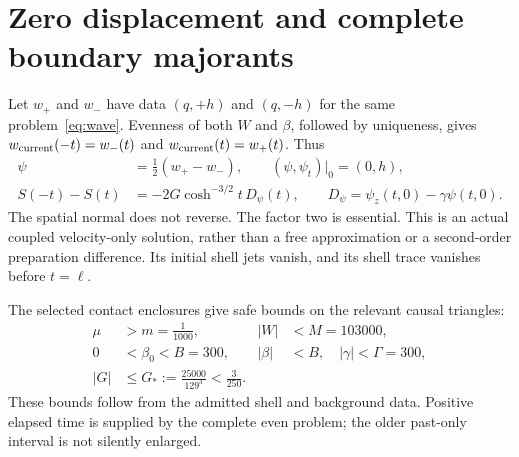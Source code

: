 \documentclass[11pt]{article}
\begin{document}
\section{Zero displacement and complete boundary majorants}
Let $w_+$ and $w_-$ have data $(q,+h)$ and $(q,-h)$ for the same
problem~\eqref{eq:wave}. Evenness of both $W$ and $\beta$, followed by
uniqueness, gives $w_{\rm current}(-t)=w_-(t)$ and
$w_{\rm current}(t)=w_+(t)$. Thus
\[
\begin{aligned}
 \psi&=\tfrac12(w_+-w_-),\qquad (\psi,\psi_t)|_0=(0,h),\\
 S(-t)-S(t)&=-2G\cosh^{-3/2}t\,D_\psi(t),\qquad
 D_\psi=\psi_z(t,0)-\gamma\psi(t,0).
\end{aligned}
\]
The spatial normal does not reverse. The factor two is essential. This is
an actual coupled velocity-only solution, rather than a free approximation
or a second-order preparation difference. Its initial shell jets vanish,
and its shell trace vanishes before $t=\ell$.

The selected contact enclosures give safe bounds on the relevant causal
triangles:
\begin{equation}
\begin{aligned}
 \mu&>m=\frac1{1000},& |W|&<M=103000,\\
 0&<\beta_0<B=300,& |\beta|&<B,\quad |\gamma|<\Gamma=300,\\
 |G|&\le G_*:=\frac{25000}{129^3}<\frac3{250}.&&
\end{aligned}
 \label{eq:constants}
\end{equation}
These bounds follow from the admitted shell and background data. Positive
elapsed time is supplied by the complete even problem; the older past-only
interval is not silently enlarged.
\end{document}
